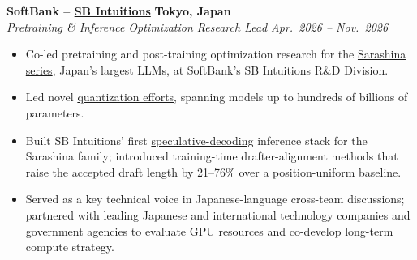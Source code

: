 \documentclass[10pt,a4paper]{article}
\newcommand{\cvlink}[2]{\href{#1}{#2}}
\newcommand{\entry}[4]{%
  \noindent\textbf{#1} \hfill \textbf{#2}\\
  \textit{#3} \hfill \textit{#4}%
}
\begin{document}
\smallskip
\entry{SoftBank -- \cvlink{https://www.sbintuitions.co.jp/en/}{SB Intuitions}}{Tokyo, Japan}{Pretraining \& Inference Optimization Research Lead}{Apr.\ 2026 -- Nov.\ 2026}
\begin{itemize}[leftmargin=*, nosep, itemsep=2pt, topsep=2pt]
  \item Co-led pretraining and post-training optimization research for the \cvlink{https://huggingface.co/sbintuitions}{Sarashina series}, Japan's largest LLMs, at SoftBank's SB Intuitions R\&D Division.
  \item Led novel \cvlink{https://arxiv.org/pdf/2609.08135}{quantization efforts}, spanning models up to hundreds of billions of parameters.
  \item Built SB Intuitions' first \cvlink{https://arxiv.org/pdf/2606.11552}{speculative-decoding} inference stack for the Sarashina family; introduced training-time drafter-alignment methods that raise the accepted draft length by 21--76\% over a position-uniform baseline.
  \item Served as a key technical voice in Japanese-language cross-team discussions; partnered with leading Japanese and international technology companies and government agencies to evaluate GPU resources and co-develop long-term compute strategy.
\end{itemize}
\end{document}
